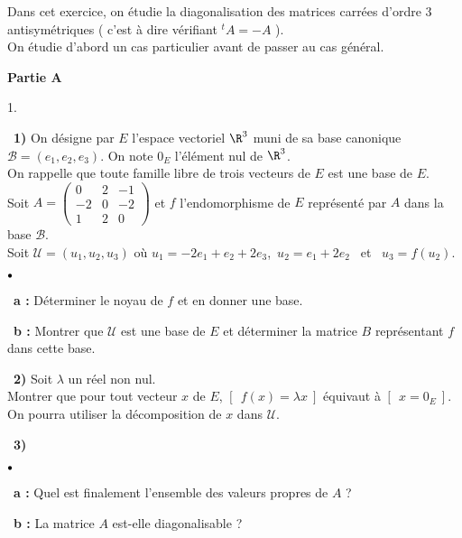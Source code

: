 \documentclass[11pt]{article}%
\begin{document}
\noindent Dans cet exercice, on étudie la diagonalisation des
matrices carrées d'ordre 3 antisymétriques ( c'est à dire vérifiant
$^{t}\!A = -A$ ).\\
On étudie d'abord un cas particulier avant de passer au cas général.

\textbf{Partie A}

\begin{noliste}{1.}
 \setlength{\itemsep}{4mm}
\item[ \ \textbf{1)}] On désigne par $E$ l'espace vectoriel $\R^{3}$
muni de sa base canonique $\mathcal{B} = (e_{1},e_{2},e_{3})$. On note
$0_{E}$
l'élément nul de $\R^{3}$.\\
On rappelle que toute famille libre de trois vecteurs de $E$ est une
base de 
$E$.\\
Soit $A = \left( 
\begin{array}{ccc}
0 & 2 & -1 \\
-2 & 0 & -2 \\
1 & 2 & 0
\end{array}
\right) $ et $f$ l'endomorphisme de $E$ représenté par $A$ dans la
base $\mathcal{B}$.\\
Soit $\mathcal{U} = (u_{1},u_{2},u_{3})$ où $u_{1} = -2e_{1} + e_{2} +
2e_{3}$,\ 
$u_{2} = e_{1} + 2e_{2}$ \ et \ $u_{3} = f(u_{2})$.

\begin{noliste}{$\scriptstyle \bullet$}
\item[ \ \textbf{a :}] Déterminer le noyau de $f$ et en donner une
base.

\item[ \ \textbf{b :}] Montrer que $\mathcal{U}$ est une base de $E$ et
déterminer la matrice $B$ représentant $f$ dans cette base.
\end{noliste}

\item[ \ \textbf{2)}] Soit $\lambda $ un réel non nul.\\
Montrer que pour tout vecteur $x$ de $E$, $[ \ \ f(x) = \lambda x\ ]$
équivaut à $[ \ \ x = 0_{E}\ ]$.\\
On pourra utiliser la décomposition de $x$ dans $\mathcal{U}$.

\item[ \ \textbf{3)}] 

\begin{noliste}{$\scriptstyle \bullet$}
\item[ \ \textbf{a :}] Quel est finalement l'ensemble des valeurs
propres de $A$
 ?

\item[ \ \textbf{b :}] La matrice $A$ est-elle diagonalisable ?
\end{noliste}
\end{noliste}
\end{document}
